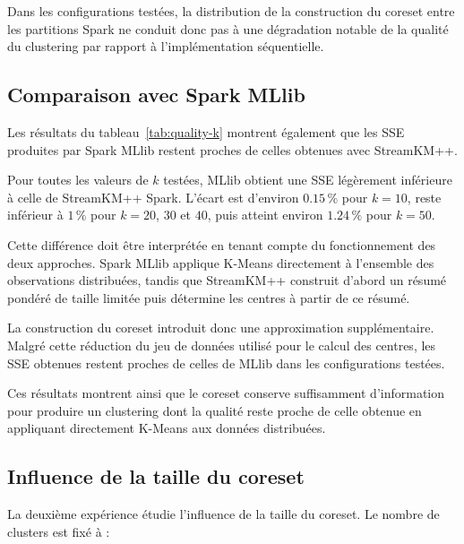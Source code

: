 Dans les configurations testées, la distribution de la construction du coreset entre les partitions Spark ne conduit donc pas à une dégradation notable de la qualité du clustering par rapport à l'implémentation séquentielle.

\subsection{Comparaison avec Spark MLlib}
\label{sec:eval-mllib}

Les résultats du tableau~\ref{tab:quality-k} montrent également que les SSE produites par Spark MLlib restent proches de celles obtenues avec StreamKM++.

Pour toutes les valeurs de \(k\) testées, MLlib obtient une SSE légèrement inférieure à celle de StreamKM++ Spark. L'écart est d'environ \(0.15\,\%\) pour \(k=10\), reste inférieur à \(1\,\%\) pour \(k=20\), \(30\) et \(40\), puis atteint environ \(1.24\,\%\) pour \(k=50\).

Cette différence doit être interprétée en tenant compte du fonctionnement des deux approches. Spark MLlib applique K-Means directement à l'ensemble des observations distribuées, tandis que StreamKM++ construit d'abord un résumé pondéré de taille limitée puis détermine les centres à partir de ce résumé.

La construction du coreset introduit donc une approximation supplémentaire. Malgré cette réduction du jeu de données utilisé pour le calcul des centres, les SSE obtenues restent proches de celles de MLlib dans les configurations testées.

Ces résultats montrent ainsi que le coreset conserve suffisamment d'information pour produire un clustering dont la qualité reste proche de celle obtenue en appliquant directement K-Means aux données distribuées.

\subsection{Influence de la taille du coreset}
\label{sec:eval-m}

La deuxième expérience étudie l'influence de la taille du coreset. Le nombre de clusters est fixé à :

